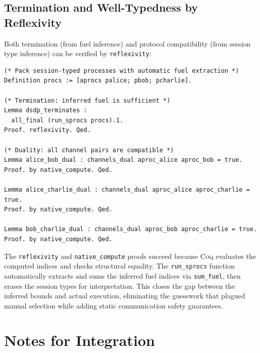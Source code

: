 \documentclass[11pt]{article}
\newcommand{\coqin}[1]{\texttt{#1}}
\newcommand{\coq}{\textsc{Coq}}
\begin{document}
\subsection{Termination and Well-Typedness by Reflexivity}

Both termination (from fuel inference) and protocol compatibility (from
session type inference) can be verified by \coqin{reflexivity}:

\begin{verbatim}
(* Pack session-typed processes with automatic fuel extraction *)
Definition procs := [aprocs palice; pbob; pcharlie].

(* Termination: inferred fuel is sufficient *)
Lemma dsdp_terminates :
  all_final (run_sprocs procs).1.
Proof. reflexivity. Qed.

(* Duality: all channel pairs are compatible *)
Lemma alice_bob_dual : channels_dual aproc_alice aproc_bob = true.
Proof. by native_compute. Qed.

Lemma alice_charlie_dual : channels_dual aproc_alice aproc_charlie = true.
Proof. by native_compute. Qed.

Lemma bob_charlie_dual : channels_dual aproc_bob aproc_charlie = true.
Proof. by native_compute. Qed.
\end{verbatim}

The \coqin{reflexivity} and \coqin{native\_compute} proofs succeed because
\coq{} evaluates the computed indices and checks structural equality.
The \coqin{run\_sprocs} function automatically extracts and sums the inferred
fuel indices via \coqin{sum\_fuel}, then erases the session types for
interpretation. This closes the gap between the inferred bounds and actual
execution, eliminating the guesswork that plagued manual selection while
adding static communication safety guarantees.


\section*{Notes for Integration}
\end{document}
